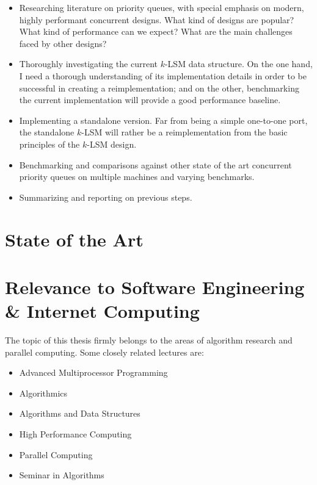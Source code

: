 \documentclass[a4paper,10pt]{article}
\begin{document}
\begin{itemize}
    \item Researching literature on priority queues, with special emphasis on
        modern, highly performant concurrent designs. What kind of designs
        are popular? What kind of performance can we expect? What are the
        main challenges faced by other designs?
    \item Thoroughly investigating the current $k$-LSM data structure. On
        the one hand, I need a thorough understanding of its implementation
        details in order to be successful in creating a reimplementation; and
        on the other, benchmarking the current implementation will provide a
        good performance baseline.
    \item Implementing a standalone version. Far from being a simple one-to-one 
        port, the standalone $k$-LSM will rather be a reimplementation from
        the basic principles of the $k$-LSM design. 
    \item Benchmarking and comparisons against other state of the art concurrent
        priority queues on multiple machines and varying benchmarks.
    \item Summarizing and reporting on previous steps.
\end{itemize}

\section{State of the Art}

\section{Relevance to Software Engineering \& Internet Computing}

The topic of this thesis firmly belongs to the areas of algorithm research
and parallel computing. Some closely related lectures are:

\begin{itemize}
    \item Advanced Multiprocessor Programming
    \item Algorithmics
    \item Algorithms and Data Structures
    \item High Performance Computing
    \item Parallel Computing
    \item Seminar in Algorithms
\end{itemize}

\nocite{*} %
\printbibliography
\end{document}
